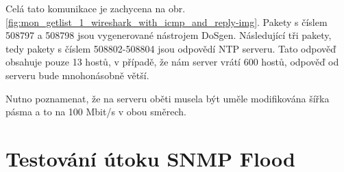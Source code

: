 Celá tato komunikace je zachycena na obr. \ref{fig:mon_getlist_1_wireshark_with_icmp_and_reply-img}. Pakety s číslem 508797 a 508798 jsou vygenerované nástrojem DoSgen. Následující tři pakety, tedy pakety s číslem 508802-508804 jsou odpovědí NTP serveru. Tato odpověď obsahuje pouze 13 hostů, v případě, že nám server vrátí 600 hostů, odpověď od serveru bude mnohonásobně větší.

Nutno poznamenat, že na serveru oběti musela být uměle modifikována šířka pásma a to na 100 Mbit/s v obou směrech.

\section{Testování útoku SNMP Flood}




